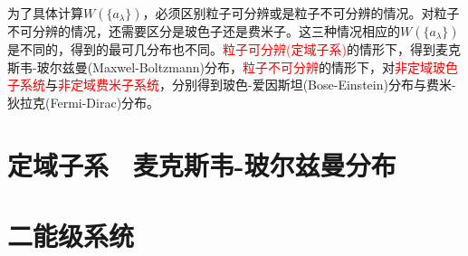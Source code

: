 \documentclass[12pt,a4paper]{article}
\begin{document}
为了具体计算$W(\{a_\lambda \})$，必须区别粒子可分辨或是粒子不可分辨的情况。对粒子不可分辨的情况，还需要区分是玻色子还是费米子。这三种情况相应的$W(\{a_\lambda \})$是不同的，得到的最可几分布也不同。\textcolor{red}{粒子可分辨(定域子系)}的情形下，得到麦克斯韦-玻尔兹曼(Maxwel-Boltzmann)分布，\textcolor{red}{粒子不可分辨}的情形下，对\textcolor{red}{非定域玻色子系统}与\textcolor{red}{非定域费米子系统}，分别得到玻色-爱因斯坦(Bose-Einstein)分布与费米-狄拉克(Fermi-Dirac)分布。

\section{定域子系 ~麦克斯韦-玻尔兹曼分布}








































\section{二能级系统}
\end{document}
